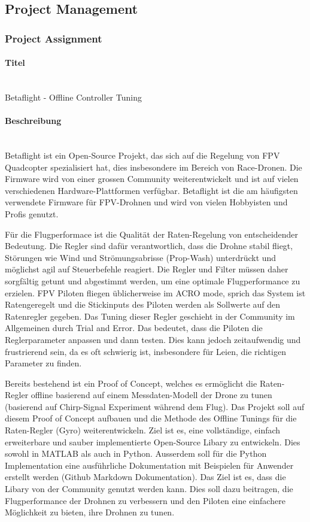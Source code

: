\documentclass[a4paper,11pt]{scrartcl}
\begin{document}
\subsection{Project Management}
\subsubsection*{Project Assignment}

\paragraph{Titel}~\\
Betaflight - Offline Controller Tuning

\paragraph{Beschreibung}~\\
Betaflight ist ein Open-Source Projekt, das sich auf die Regelung von FPV Quadcopter spezialisiert hat, dies insbesondere im Bereich von Race-Dronen. Die Firmware wird von einer grossen Community weiterentwickelt und ist auf vielen verschiedenen Hardware-Plattformen verfügbar. Betaflight ist die am häufigsten verwendete Firmware für FPV-Drohnen und wird von vielen Hobbyisten und Profis genutzt.

Für die Flugperformace ist die Qualität der Raten-Regelung von entscheidender Bedeutung. Die Regler sind dafür verantwortlich, dass die Drohne stabil fliegt, Störungen wie Wind und Strömungsabrisse (Prop-Wash) unterdrückt und möglichst agil auf Steuerbefehle reagiert. Die Regler und Filter müssen daher sorgfältig getunt und abgestimmt werden, um eine optimale Flugperformance zu erzielen. FPV Piloten fliegen üblicherweise im ACRO mode, sprich das System ist Ratengeregelt und die Stickinputs des Piloten werden als Sollwerte auf den Ratenregler gegeben. Das Tuning dieser Regler geschieht in der Community im Allgemeinen durch Trial and Error. Das bedeutet, dass die Piloten die Reglerparameter anpassen und dann testen. Dies kann jedoch zeitaufwendig und frustrierend sein, da es oft schwierig ist, insbesondere für Leien, die richtigen Parameter zu finden.

Bereits bestehend ist ein Proof of Concept, welches es ermöglicht die Raten-Regler offline basierend auf einem Messdaten-Modell der Drone zu tunen (basierend auf Chirp-Signal Experiment während dem Flug). Das Projekt soll auf diesem Proof of Concept aufbauen und die Methode des Offline Tunings für die Raten-Regler (Gyro) weiterentwickeln. Ziel ist es, eine vollständige, einfach erweiterbare und sauber implementierte Open-Source Libary zu entwickeln. Dies sowohl in MATLAB als auch in Python. Ausserdem soll für die Python Implementation eine ausführliche Dokumentation mit Beispielen für Anwender erstellt werden (Github Markdown Dokumentation). Das Ziel ist es, dass die Libary von der Community genutzt werden kann. Dies soll dazu beitragen, die Flugperformance der Drohnen zu verbessern und den Piloten eine einfachere Möglichkeit zu bieten, ihre Drohnen zu tunen.
\end{document}
